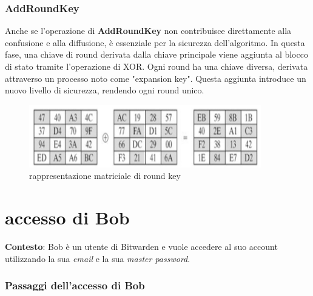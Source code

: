 \documentclass[a4paper,12pt]{report}
\begin{document}
				\subsection*{AddRoundKey}
				Anche se l'operazione di \textbf{AddRoundKey} non contribuisce
				direttamente alla confusione e alla diffusione, è essenziale per
				la sicurezza dell'algoritmo. In questa fase, una chiave di round
				derivata dalla chiave principale viene aggiunta al blocco di
				stato tramite l'operazione di XOR. Ogni round ha una chiave
				diversa, derivata attraverso un processo noto come "expansion
				key". Questa aggiunta introduce un nuovo livello di sicurezza,
				rendendo ogni round unico.
				\begin{figure}[H]
					\centering
					\includegraphics[width=0.9\textwidth]{roundKey.png}
					\caption{rappresentazione matriciale di round key}
				\end{figure}
							
			\chapter{accesso di Bob}
				\textbf{Contesto}: Bob è un utente di Bitwarden e vuole accedere al suo account utilizzando la sua \textit{email} e la sua \textit{master password}.

				\subsection*{Passaggi dell'accesso di Bob}
\end{document}
